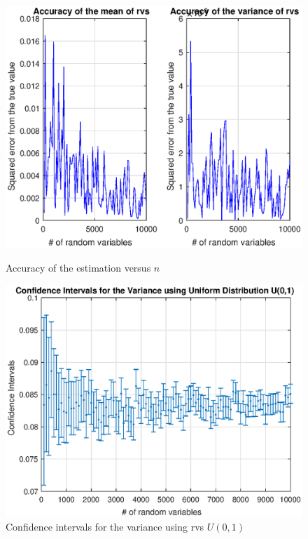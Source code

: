 \documentclass[11pt,a4paper]{article}
\begin{document}
\begin{figure}[ht]
	\centering
	\begin{minipage}{0.45\textwidth}
		\centering
		\includegraphics[width=\textwidth]{ex4_accuracy}
		\caption{Accuracy of the estimation versus $n$}
		\label{fig:ex4_accuracy}
	\end{minipage}
	\begin{minipage}{0.45\textwidth}
		\centering
		\includegraphics[width=\textwidth]{ex4_CI}
		\caption{Confidence intervals for the variance using rvs $U(0,1)$}
		\label{fig:ex4_CI}
	\end{minipage}
\end{figure}
\end{document}
